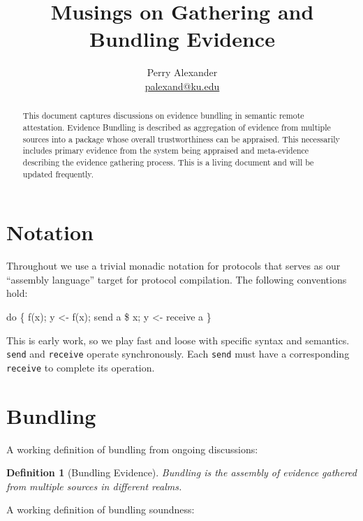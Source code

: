 \documentclass[10pt]{article}
\title{Musings on Gathering and Bundling Evidence}
\author{Perry Alexander \\
 \url{palexand@ku.edu}}
\newtheorem{definition}{Definition}
\begin{document}
\maketitle

\begin{abstract}
  This document captures discussions on evidence bundling in semantic
  remote attestation.  Evidence Bundling is described as aggregation
  of evidence from multiple sources into a package whose overall
  trustworthiness can be appraised.  This necessarily includes primary
  evidence from the system being appraised and meta-evidence
  describing the evidence gathering process.  This is a living
  document and will be updated frequently.
\end{abstract}

\section*{Notation}

Throughout we use a trivial monadic notation for protocols that serves
as our ``assembly language'' target for protocol compilation.
The following conventions hold:

\begin{listing}
  do \{                %
       f(x);          %
       y <- f(x);     %
       send a \$ x;    %
       y <- receive a %
  \}
\end{listing}

This is early work, so we play fast and loose with specific syntax and
semantics.  \Verb+send+ and \Verb+receive+ operate synchronously.
Each \Verb+send+ must have a corresponding \Verb+receive+ to complete
its operation.

\section*{Bundling}

A working definition of bundling from ongoing discussions:

\begin{definition}[Bundling Evidence]
  Bundling is the assembly of evidence gathered from multiple sources
  in different realms.
\end{definition}

A working definition of bundling soundness:
\end{document}
